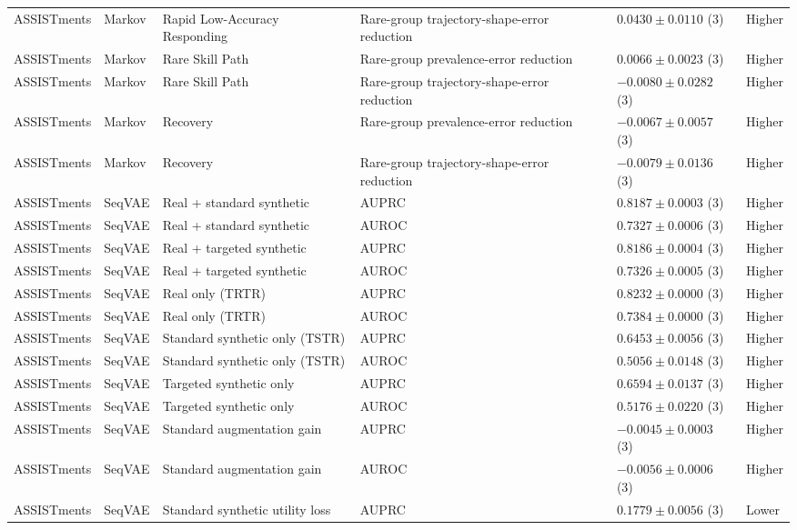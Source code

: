 \begin{longtable}{@{}p{2.25cm}p{2.05cm}p{4.7cm}p{5.0cm}p{2.6cm}p{1.25cm}@{}}
ASSISTments & Markov & Rapid Low-Accuracy Responding & Rare-group trajectory-shape-error reduction & $0.0430 \mathbin{\pm} 0.0110$ (3) & Higher \\
ASSISTments & Markov & Rare Skill Path & Rare-group prevalence-error reduction & $0.0066 \mathbin{\pm} 0.0023$ (3) & Higher \\
ASSISTments & Markov & Rare Skill Path & Rare-group trajectory-shape-error reduction & $-0.0080 \mathbin{\pm} 0.0282$ (3) & Higher \\
ASSISTments & Markov & Recovery & Rare-group prevalence-error reduction & $-0.0067 \mathbin{\pm} 0.0057$ (3) & Higher \\
ASSISTments & Markov & Recovery & Rare-group trajectory-shape-error reduction & $-0.0079 \mathbin{\pm} 0.0136$ (3) & Higher \\
ASSISTments & SeqVAE & Real + standard synthetic & AUPRC & $0.8187 \mathbin{\pm} 0.0003$ (3) & Higher \\
ASSISTments & SeqVAE & Real + standard synthetic & AUROC & $0.7327 \mathbin{\pm} 0.0006$ (3) & Higher \\
ASSISTments & SeqVAE & Real + targeted synthetic & AUPRC & $0.8186 \mathbin{\pm} 0.0004$ (3) & Higher \\
ASSISTments & SeqVAE & Real + targeted synthetic & AUROC & $0.7326 \mathbin{\pm} 0.0005$ (3) & Higher \\
ASSISTments & SeqVAE & Real only (TRTR) & AUPRC & $0.8232 \mathbin{\pm} 0.0000$ (3) & Higher \\
ASSISTments & SeqVAE & Real only (TRTR) & AUROC & $0.7384 \mathbin{\pm} 0.0000$ (3) & Higher \\
ASSISTments & SeqVAE & Standard synthetic only (TSTR) & AUPRC & $0.6453 \mathbin{\pm} 0.0056$ (3) & Higher \\
ASSISTments & SeqVAE & Standard synthetic only (TSTR) & AUROC & $0.5056 \mathbin{\pm} 0.0148$ (3) & Higher \\
ASSISTments & SeqVAE & Targeted synthetic only & AUPRC & $0.6594 \mathbin{\pm} 0.0137$ (3) & Higher \\
ASSISTments & SeqVAE & Targeted synthetic only & AUROC & $0.5176 \mathbin{\pm} 0.0220$ (3) & Higher \\
ASSISTments & SeqVAE & Standard augmentation gain & AUPRC & $-0.0045 \mathbin{\pm} 0.0003$ (3) & Higher \\
ASSISTments & SeqVAE & Standard augmentation gain & AUROC & $-0.0056 \mathbin{\pm} 0.0006$ (3) & Higher \\
ASSISTments & SeqVAE & Standard synthetic utility loss & AUPRC & $0.1779 \mathbin{\pm} 0.0056$ (3) & Lower \\

\end{longtable}
